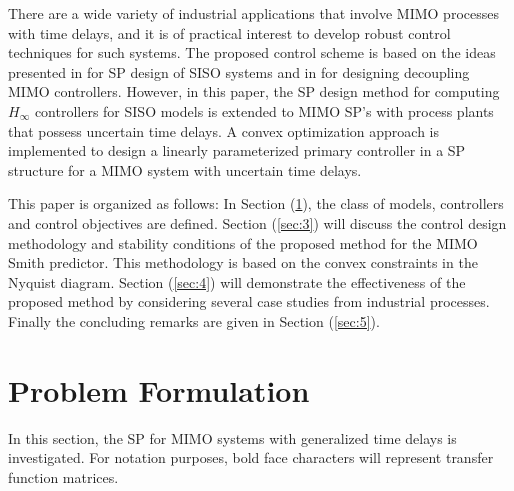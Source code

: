 \documentclass[A4, 10pt, conference]{ieeeconf}
\begin{document}
There are a wide variety of industrial applications that involve MIMO processes with time delays, and it is of practical interest to develop robust control techniques for such systems. The proposed control scheme is based on the ideas presented in \cite{VK13}  for SP design of SISO systems and in \cite{GKL10b} for designing decoupling MIMO controllers. However, in this paper, the SP design method for computing $H_\infty$ controllers for SISO models is extended to MIMO SP's with process plants that possess uncertain time delays. A convex optimization approach is implemented to design a linearly parameterized primary controller in a SP structure for a MIMO system with uncertain time delays. %

This paper is organized as follows: In Section (\ref{sec:2}), the class of models, controllers and control objectives are defined. Section (\ref{sec:3}) will discuss the control design methodology and stability conditions of the proposed method for the MIMO Smith predictor. This methodology is based on the convex constraints in the Nyquist diagram. Section (\ref{sec:4}) will demonstrate the effectiveness of the proposed method by considering several case studies from industrial processes. Finally the concluding remarks are given in Section (\ref{sec:5}). 
\section{Problem Formulation}
\label{sec:2}
In this section, the SP for MIMO systems with generalized time delays is investigated. For notation purposes, bold face characters will represent transfer function matrices.
\end{document}
